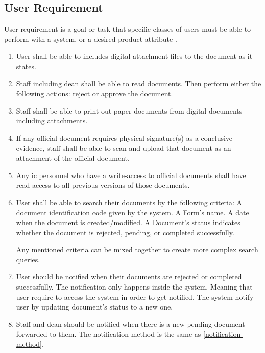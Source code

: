 \subsection{User Requirement}
User requirement is a goal or task that specific classes of users must be able to perform with a system, or a desired product attribute \cite{wiegers_2003}.
\begin{enumerate}
	\item 
	User shall be able to includes digital attachment files to the document as it states.
	
	\item
	Staff including dean shall be able to read documents.
	Then perform either the following actions: reject or approve the document.
	
	\item
	Staff shall be able to print out paper documents from digital documents including attachments.
	
	\item
	If any official document requires physical signature(s) as a conclusive evidence, staff shall be able to scan and upload that document as an attachment of the official document.
	
	\item
	Any \gls{ic} personnel who have a write-access to official documents shall have read-access to all previous versions of those documents.
	
	\item
	User shall be able to search their documents by the following criteria:
	\subitem A document identification code given by the system.
	\subitem A Form's name.
	\subitem A date when the document is created/modified.
	\subitem A Document's status indicates whether the document is rejected, pending, or completed successfully.
	
	Any mentioned criteria can be mixed together to create more complex search queries.
	
	\item
	\label{notification-method}
	User should be notified when their documents are rejected or completed successfully.
	The notification only happens inside the system.
	Meaning that user require to access the system in order to get notified.
	The system notify user by updating document's status to a new one.
	
	\item
	Staff and dean should be notified when there is a new pending document forwarded to them.
	The notification method is the same as \ref{notification-method}.
\end{enumerate}

